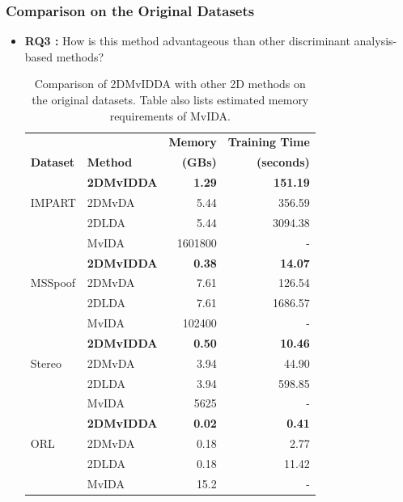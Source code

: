 \subsubsection{Comparison on the Original Datasets}
\label{ssubs:2DMvIDDA_Orig}
\begin{itemize}
\item \textbf{RQ3 :}
How is this method advantageous than other discriminant analysis-based methods?


\begin{table}[t]
	\centering
	\caption{Comparison of 2DMvIDDA with other 2D methods on the original datasets. Table also lists estimated memory requirements of MvIDA.}
	\label{tab:2DMvIDDA_Res_All_Orig}
	\begin{tabular}{l l r r} \hline
		
		 &  & \textbf{Memory} & \textbf{Training Time} \\
		\textbf{Dataset} & \textbf{Method} & \textbf{(GBs)} & \textbf{(seconds)} \\ \hline
		 
		       & \textbf{2DMvIDDA} & \textbf{1.29} & \textbf{151.19} \\ 
		IMPART & 2DMvDA   & 5.44 & 356.59 \\ 
			   & 2DLDA    & 5.44 & 3094.38 \\
		       & MvIDA    & 1601800 & - \\  \hline
		       
		       & \textbf{2DMvIDDA} & \textbf{0.38} & \textbf{14.07} \\ 
	   MSSpoof & 2DMvDA   & 7.61 & 126.54 \\ 
			   & 2DLDA    & 7.61 & 1686.57 \\
		       & MvIDA    & 102400 & - \\  \hline
		       
		       & \textbf{2DMvIDDA} & \textbf{0.50} & \textbf{10.46} \\ 
		Stereo & 2DMvDA   & 3.94 & 44.90 \\ 
			   & 2DLDA    & 3.94 & 598.85 \\
		       & MvIDA    & 5625 & - \\  \hline
		       
		       & \textbf{2DMvIDDA} & \textbf{0.02} & \textbf{0.41} \\ 
		ORL    & 2DMvDA   & 0.18 & 2.77 \\ 
			   & 2DLDA    & 0.18 & 11.42 \\
		       & MvIDA    & 15.2 & - \\  \hline
	\end{tabular}
\end{table}


\end{itemize}
